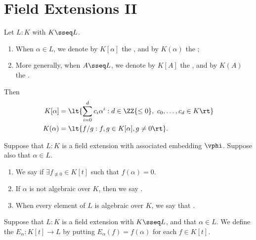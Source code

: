 \documentclass[a4paper]{article}
\begin{document}
\section{Field Extensions II}
\begin{tdefinition}
  Let $ L:K $ with $ K\sseq L $.
  \begin{enumerate}[label=(\roman*)]
    \item When $\alpha\in L$, we denote by $K[\alpha]$ the , and by $K(\alpha)$ the ;
    \item More generally, when $A\sseq L$, we denote by $K[A]$ the , and by $K(A)$ the .
  \end{enumerate}
  Then \begin{align*}
    K[\alpha] &= \lt\{ \sum_{i=0}^{d}c_i\alpha^i : d\in \ZZ{\leq 0},\ c_0,\ldots,c_d\in K \rt\} \\
    K(\alpha) &= \lt\{ f/g : f,g\in K[\alpha], g\neq 0 \rt\}.
  \end{align*}
\end{tdefinition}

\begin{tdefinition}
  Suppose that $L: K$ is a field extension with associated embedding $ \vphi $.
  Suppose also that $\alpha\in L$. \begin{enumerate}[label=(\roman*)]
    \item We say  if $\exists f_{\not\equiv 0} \in K[t]$ such that $ f(\alpha)=0 $.
    \item If $\alpha$ is not algebraic over $K$, then we say .
    \item When every element of $L$ is algebraic over $K$, we say that .
  \end{enumerate}
\end{tdefinition}

\begin{tdefinition}
  Suppose that $L: K$ is a field extension with $K \sseq L$, and that $ \alpha\in L $.
  We define the  $E_\alpha : K[t] \to L$ by putting $E_\alpha(f) = f(\alpha)$ for each $f \in K[t]$.
\end{tdefinition}
\end{document}
